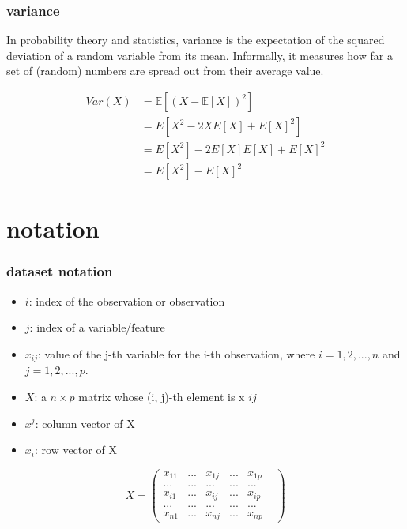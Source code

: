 \documentclass{beamer}
\begin{document}
\begin{frame}
\frametitle{variance}

In probability theory and statistics, variance is the expectation of the squared deviation of a random variable from its mean. Informally, it measures how far a set of (random) numbers are spread out from their average value.


\begin{align*}
Var(X) &= \mathbb{E}[(X - \mathbb{E}[X])^2] \\
&= E[X^2 - 2XE[X] + E[X]^2] \\
&= E[X^2] - 2E[X]E[X] + E[X]^2 \\
&= E[X^2] - E[X]^2
\end{align*}


\end{frame}

\section{notation}



\begin{frame}
\frametitle{dataset notation}
\begin{itemize}
\item $i$: index of the observation or observation
\item $j$: index of a variable/feature
\item $x_{ij}$: value of the j-th variable for the i-th observation,
where $i = 1, 2, . . ., n$ and $j = 1, 2, . . . , p$.
\item $X$: a $n\times p$ matrix whose (i, j)-th element is x $ij$
\item $x^j$: column vector of X
\item $x_{i}$: row vector of X
\end{itemize}
$$
X = 
\begin{pmatrix} 
x_{11} & ...& x_{1j} & ... & x_{1p} \\
... & ... &...& ...& ...\\
x_{i1} & ... & x_{ij} & ... &x_{ip}\\
... & ...& ...& ...& ...\\
x_{n1} & ... & x_{nj}& ...& x_{np} & 
\end{pmatrix}
$$

\end{frame}
\end{document}
